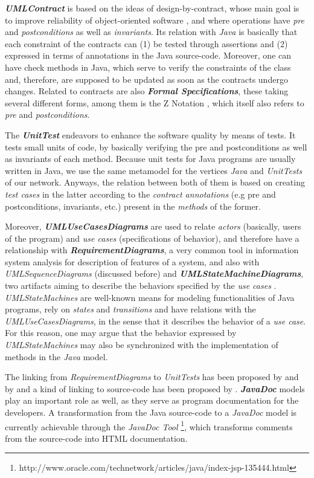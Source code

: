\documentclass[tuberlin,cic,tc,english,noabntcite,oneside]{iiufrgs}
\begin{document}
\textbf{\emph{UMLContract}} is based on the ideas of design-by-contract, whose main goal is to improve reliability of object-oriented software \citep{meyer1992applying}, and where operations have \emph{pre} and \emph{postconditions} as well as \emph{invariants}. Its relation with \emph{Java} is basically that each constraint of the contracts can (1) be tested through assertions and (2) expressed in terms of annotations in the Java source-code. Moreover, one can have check methods in Java, which serve to verify the constraints of the class and, therefore, are supposed to be updated as soon as the contracts undergo changes. Related to contracts are also \textbf{\emph{Formal Specifications}}, these taking several different forms, among them is the Z Notation \citep{spivey1992z}, which itself also refers to \emph{pre} and \emph{postconditions}.

The \textbf{\emph{UnitTest}} endeavors to enhance the software quality by means of tests. It tests small units of code, by basically verifying the pre and postconditions as well as invariants of each method. Because unit tests for Java programs are usually written in Java, we use the same metamodel for the vertices \emph{Java} and \emph{UnitTests} of our network. Anyways, the relation between both of them is based on creating \emph{test cases} in the latter according to the \emph{contract annotations} (e.g pre and postconditions, invariants, etc.) present in the \emph{methods} of the former.

Moreover, \textbf{\emph{UMLUseCasesDiagrams}} are used to relate \emph{actors} (basically, users of the program) and \emph{use cases} (specifications of behavior), and therefore have a relationship with \textbf{\emph{RequirementDiagrams}}, a very common tool in information system analysis for description of features of a system, and also with \emph{UMLSequenceDiagrams} (discussed before) and \textbf{\emph{UMLStateMachineDiagrams}}, two artifacts aiming to describe the behaviors specified by the \emph{use cases} \citep[p. 637]{omg2007unified}. \emph{UMLStateMachines} are well-known means for modeling functionalities of Java programs, rely on \emph{states} and \emph{transitions} and have relations with the \emph{UMLUseCasesDiagrams}, in the sense that it describes the behavior of a \emph{use case}. For this reason, one may argue that the behavior expressed by \emph{UMLStateMachines} may also be synchronized with the implementation of methods in the \emph{Java} model.

The linking from \emph{RequirementDiagrams} to \emph{UnitTests} has been proposed by \citet{noack2013automatic} and by \citet{post2009linking} and a kind of linking to source-code has been proposed by \citet{antoniol2002recovering}. \textbf{\emph{JavaDoc}} models play an important role as well, as they serve as program documentation for the developers. A transformation from the Java source-code to a \emph{JavaDoc} model is currently achievable through the \emph{JavaDoc Tool} \footnote{http://www.oracle.com/technetwork/articles/java/index-jsp-135444.html}, which transforms comments from the source-code into HTML documentation.
\end{document}
